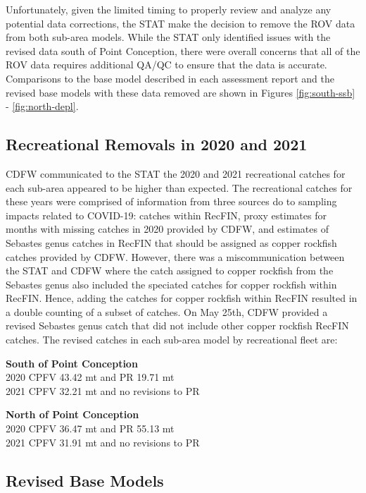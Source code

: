 \documentclass[
  letterpaper,
]{article}
\begin{document}
Unfortunately, given the limited timing to properly review and analyze any potential data corrections, the STAT make the decision to remove the ROV data from both sub-area models. While the STAT only identified issues with the revised data south of Point Conception, there were overall concerns that all of the ROV data requires additional QA/QC to ensure that the data is accurate. Comparisons to the base model described in each assessment report and the revised base models with these data removed are shown in Figures \ref{fig:south-ssb} - \ref{fig:north-depl}.

\hypertarget{recreational-removals-in-2020-and-2021}{%
\subsection{Recreational Removals in 2020 and 2021}\label{recreational-removals-in-2020-and-2021}}

CDFW communicated to the STAT the 2020 and 2021 recreational catches for each sub-area appeared to be higher than expected. The recreational catches for these years were comprised of information from three sources do to sampling impacts related to COVID-19: catches within RecFIN, proxy estimates for months with missing catches in 2020 provided by CDFW, and estimates of Sebastes genus catches in RecFIN that should be assigned as copper rockfish catches provided by CDFW. However, there was a miscommunication between the STAT and CDFW where the catch assigned to copper rockfish from the Sebastes genus also included the speciated catches for copper rockfish within RecFIN. Hence, adding the catches for copper rockfish within RecFIN resulted in a double counting of a subset of catches. On May 25th, CDFW provided a revised Sebastes genus catch that did not include other copper rockfish RecFIN catches. The revised catches in each sub-area model by recreational fleet are:

\textbf{South of Point Conception}\\
2020 CPFV 43.42 mt and PR 19.71 mt\\
2021 CPFV 32.21 mt and no revisions to PR

\textbf{North of Point Conception}\\
2020 CPFV 36.47 mt and PR 55.13 mt\\
2021 CPFV 31.91 mt and no revisions to PR

\hypertarget{revised-base-models}{%
\subsection{Revised Base Models}\label{revised-base-models}}
\end{document}
